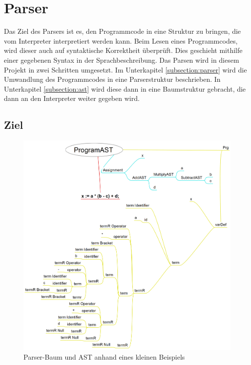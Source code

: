 \section{Parser}

Das Ziel des Parsers ist es, den Programmcode in eine Struktur zu bringen, die vom Interpreter interpretiert werden kann. Beim Lesen eines Programmcodes, wird dieser auch auf syntaktische Korrektheit überprüft. Dies geschieht mithilfe einer gegebenen Syntax in der Sprachbeschreibung.
Das Parsen wird in diesem Projekt in zwei Schritten umgesetzt. Im Unterkapitel \ref{subsection:parser} wird die Umwandlung des Programmcodes in eine Parserstruktur beschrieben. In Unterkapitel \ref{subsection:ast} wird diese dann in eine Baumstruktur gebracht, die dann an den Interpreter weiter gegeben wird. 

\subsection{Ziel}

\begin{figure}[tbh]
	\includegraphics[width=1.0\linewidth]{images/parser-to-ast}
	\caption[Parser-Baum und AST]{Parser-Baum und AST anhand eines kleinen Beispiels}
	\label{fig:parseast}
\end{figure}


